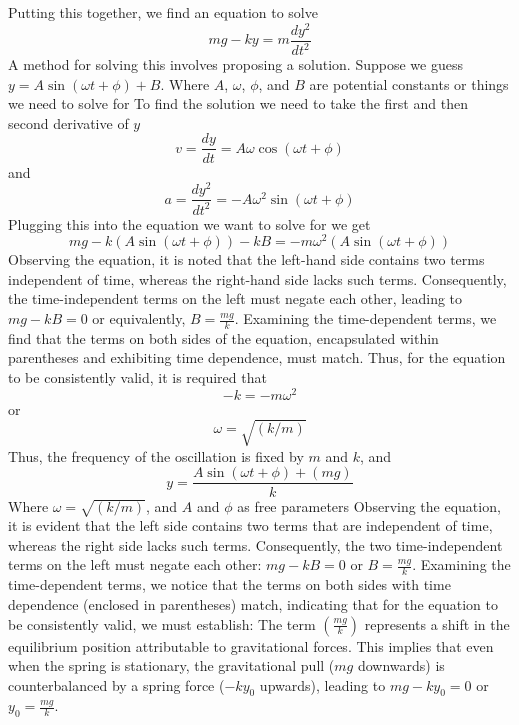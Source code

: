 \documentclass{report}
\begin{document}
\bigbreak \noindent 
Putting this together, we find an equation to solve
\begin{equation}
    mg - ky = m \frac{dy^{2}}{dt^{2}}
\end{equation}
\bigbreak \noindent 
A method for solving this involves proposing a solution. Suppose we guess $y=A\sin{\left(\omega t + \phi\right) + B} $. Where $A$, $\omega$, $\phi$, and $B$ are potential constants or things we need to solve for
\bigbreak \noindent 
To find the solution we need to take the first and then second derivative of $y$
\bigbreak \noindent 
\begin{equation}
    v=\frac{dy}{dt} = A\omega\cos{\left(\omega t + \phi\right)}
\end{equation}
and
\bigbreak \noindent 
\begin{equation}
    a = \frac{dy^{2}}{dt^{2}} = -A\omega^{2}\sin{\left(\omega t + \phi\right)}
\end{equation}
Plugging this into the equation we want to solve for we get
\begin{equation}
    mg -k(A\sin{\left(\omega t + \phi\right)}) -kB = -m\omega^{2}(A\sin{\left(\omega t + \phi\right)})
\end{equation}
\bigbreak \noindent 
Observing the equation, it is noted that the left-hand side contains two terms independent of time, whereas the right-hand side lacks such terms. Consequently, the time-independent terms on the left must negate each other, leading to $mg - kB = 0$ or equivalently, $B = \frac{mg}{k}$. Examining the time-dependent terms, we find that the terms on both sides of the equation, encapsulated within parentheses and exhibiting time dependence, must match. Thus, for the equation to be consistently valid, it is required that
\begin{equation}
    -k = -m\omega^{2} 
\end{equation}
or
\begin{equation}
    \omega = \sqrt{(k/m)} 
\end{equation}
\bigbreak \noindent 
Thus, the frequency of the oscillation is fixed by $m$ and $k$, and
\begin{equation}
    y= \frac{A\sin{\left(\omega t + \phi\right)}  + (mg)}{k}
\end{equation}
Where $\omega = \sqrt{(k/m)}$, and $A$ and $\phi$ as free parameters
\bigbreak \noindent 
Observing the equation, it is evident that the left side contains two terms that are independent of time, whereas the right side lacks such terms. Consequently, the two time-independent terms on the left must negate each other: $mg - kB = 0$ or $B = \frac{mg}{k}$. Examining the time-dependent terms, we notice that the terms on both sides with time dependence (enclosed in parentheses) match, indicating that for the equation to be consistently valid, we must establish:
\bigbreak \noindent 
The term $\left(\frac{mg}{k}\right)$ represents a shift in the equilibrium position attributable to gravitational forces. This implies that even when the spring is stationary, the gravitational pull ($mg$ downwards) is counterbalanced by a spring force ($-ky_0$ upwards), leading to $mg - ky_0 = 0$ or $y_0 = \frac{mg}{k}$.
\end{document}
